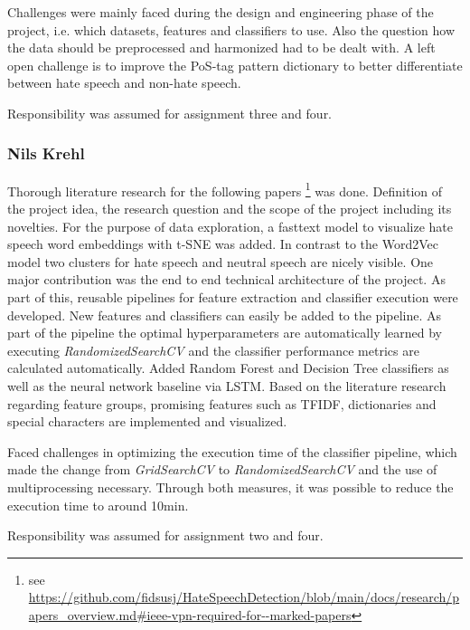 Challenges were mainly faced during the design and engineering phase of the project, i.e. which datasets, features and classifiers to use. Also the question how the data should be preprocessed and harmonized had to be dealt with. A left open challenge is to improve the PoS-tag pattern dictionary to better differentiate between hate speech and non-hate speech. 

Responsibility was assumed for assignment three and four.

\subsubsection*{Nils Krehl}

Thorough literature research for the following papers \footnote{see \url{https://github.com/fidsusj/HateSpeechDetection/blob/main/docs/research/papers_overview.md\#ieee-vpn-required-for--marked-papers}} was done.
Definition of the project idea, the research question and the scope of the project including its novelties. 
For the purpose of data exploration, a fasttext model to visualize hate speech word embeddings with t-SNE was added. In contrast to the Word2Vec model two clusters for hate speech and neutral speech are nicely visible.
One major contribution was the end to end technical architecture of the project. As part of this, reusable pipelines for feature extraction and classifier execution were developed. New features and classifiers can easily be added to the pipeline. As part of the pipeline the optimal hy\-per\-pa\-ra\-me\-ters are automatically learned by executing \textit{RandomizedSearchCV} and the classifier performance metrics are calculated automatically. Added Random Forest and Decision Tree classifiers as well as the neural network baseline via LSTM. 
Based on the literature research regarding feature groups, promising features such as TFIDF, dictionaries and special characters are implemented and visualized.

Faced challenges in optimizing the execution time of the classifier pipeline, which made the change from \textit{GridSearchCV} to \textit{RandomizedSearchCV} and the use of multiprocessing necessary. Through both measures, it was possible to reduce the execution time to around 10min.

Responsibility was assumed for assignment two and four.
